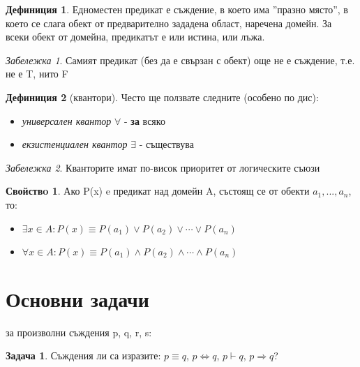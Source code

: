 \documentclass[10pt, a4paper]{article}
\theoremstyle{definition}
\newtheorem{definition}{Дефиниция}[section]
\newtheorem{problem}{Задача}
\newtheorem{prop}{Свойствo}[section]
\theoremstyle{remark}
\newtheorem*{remark}{Забележка}
\begin{document}
\begin{definition}
    Едноместен предикат е съждение, в което има ''празно място'', в което се слага обект от предварително зададена област, наречена домейн. За всеки обект от домейна, предикатът е или истина, или лъжа. 
\end{definition}
\begin{remark}
    Самият предикат (без да е свързан с обект) още не е съждение, т.е. не е T, нито F
\end{remark}

\begin{definition}[квантори] Често ще ползвате следните (особено по дис):
    \begin{itemize}
        \item \emph{универсален квантор} \(\forall\) - \textbf{за} всяко
        \item \emph{екзистенциален квантор} \(\exists\) - съществува
    \end{itemize}
\end{definition}

\begin{remark} Кванторите имат по-висок приоритет от логическите съюзи \end{remark}

\begin{prop}
\label{prop1.2}
Ако P(x) e предикат над домейн A, състоящ се от обекти \(a_1, ..., a_n\), то:
    \begin{itemize}
        \item \(\exists x\in A: P(x) \equiv P(a_1) \vee P(a_2) \vee \cdots \vee P(a_n)\)    
        \item \(\forall x\in A: P(x) \equiv P(a_1) \wedge P(a_2) \wedge \cdots \wedge P(a_n)\)    
    \end{itemize}
\end{prop}











\section{Основни задачи}
за произволни съждения p, q, r, s:
\begin{problem} Съждения ли са изразите: \(p \equiv q\), \(p\Leftrightarrow q\), \(p\vdash q\), \(p\Rightarrow q\)?
\end{problem}
\end{document}
